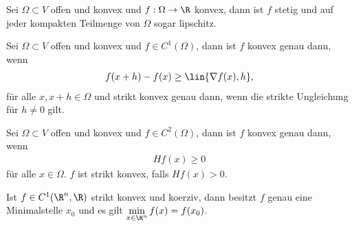 \begin{prop}
Sei $\Omega\subset V$ offen und konvex und $f: \Omega\to \R$ konvex, dann ist
$f$ stetig und auf jeder kompakten Teilmenge von $\Omega$ sogar lipschitz.
\end{prop}
\begin{prop}
Sei $\Omega\subset V$ offen und konvex und $f\in C^1(\Omega)$, dann ist $f$
konvex genau dann, wenn
\begin{align*}
f(x+h) - f(x) \ge \lin{\nabla f(x),h},
\end{align*}
für alle $x,x+h\in\Omega$ und strikt konvex genau dann, wenn die strikte
Ungleichung für $h\neq 0$ gilt.
\end{prop}
\begin{prop}
Sei $\Omega\subset V$ offen und konvex und $f\in C^2(\Omega)$, dann ist $f$
konvex genau dann, wenn
\begin{align*}
Hf(x) \ge 0
\end{align*}
für alle $x\in\Omega$. $f$ ist strikt konvex, falls $Hf(x) > 0$.
\end{prop}
\begin{prop}
Ist $f\in C^1(\R^n,\R)$ strikt konvex und koerziv, dann besitzt $f$ genau eine
Minimalstelle $x_0$ und es gilt $\min\limits_{x\in\R^n} f(x) = f(x_0)$.
\end{prop}